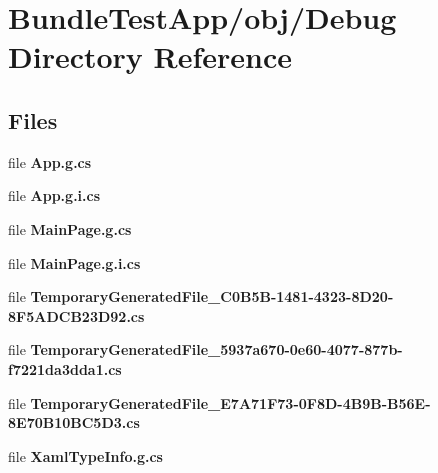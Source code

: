 \section{Bundle\+Test\+App/obj/\+Debug Directory Reference}
\label{dir_3f539a892fd46f8c82993d0ad401d5dd}
\subsection*{Files}
\begin{DoxyCompactItemize}
\item 
file {\bfseries App.\+g.\+cs}
\item 
file {\bfseries App.\+g.\+i.\+cs}
\item 
file {\bfseries Main\+Page.\+g.\+cs}
\item 
file {\bfseries Main\+Page.\+g.\+i.\+cs}
\item 
file {\bfseries Temporary\+Generated\+File\+\_\+C0\+B5\+B-\/1481-\/4323-\/8\+D20-\/8\+F5\+A\+D\+C\+B23\+D92.\+cs}
\item 
file {\bfseries Temporary\+Generated\+File\+\_\+5937a670-\/0e60-\/4077-\/877b-\/f7221da3dda1.\+cs}
\item 
file {\bfseries Temporary\+Generated\+File\+\_\+\+E7\+A71\+F73-\/0\+F8\+D-\/4\+B9\+B-\/\+B56\+E-\/8\+E70\+B10\+B\+C5\+D3.\+cs}
\item 
file {\bfseries Xaml\+Type\+Info.\+g.\+cs}
\end{DoxyCompactItemize}
